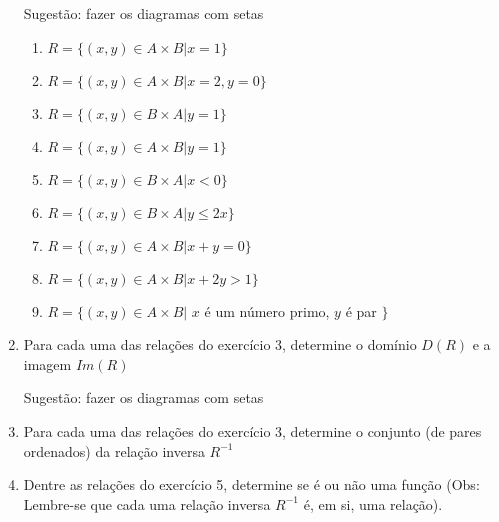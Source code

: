 \documentclass[a4paper]{article}
\begin{document}
\begin{enumerate}
Sugestão: fazer os diagramas com setas

  \begin{enumerate}
  \item $R=\{(x,y) \in A \times B | x = 1\}$
  \item $R=\{(x,y) \in A \times B | x=2, y=0\}$
  \item $R=\{(x,y) \in B \times A | y = 1 \}$
  \item $R=\{(x,y) \in A \times B | y = 1 \}$
  \item $R=\{(x,y) \in B \times A | x < 0\}$
  \item $R=\{(x,y) \in B \times A | y \le 2x\}$
  \item $R=\{(x,y) \in A \times B | x + y = 0\}$
  \item $R=\{(x,y) \in A \times B | x + 2y > 1\}$
  \item $R=\{(x,y) \in A \times B |$ $x$ é um número primo, $y$ é par $\}$
  \end{enumerate}

\item Para cada uma das relações do exercício 3, determine o domínio
  $D(R)$ e a imagem $Im(R)$

Sugestão: fazer os diagramas com setas

\item Para cada uma das relações do exercício 3, determine o conjunto
  (de pares ordenados) da relação inversa $R^{-1}$

\item Dentre as relações do exercício 5, determine se é ou não uma
  função (Obs: Lembre-se que cada uma relação inversa $R^{-1}$ é, em
  si, uma relação).

\end{enumerate}
\end{document}
